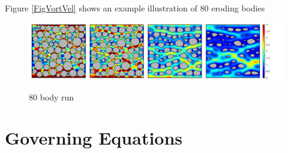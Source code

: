 \documentclass[3p]{elsarticle}
\newcommand{\vsp}[1]{\vspace{#1 pc} \noindent}
\begin{document}
\vsp{5}


Figure \ref{FigVortVel} shows an example illustration of 80 eroding bodies


\begin{figure}%
\centering \label{fig1}
\includegraphics[width = 0.99 \textwidth]{./figs/Velocity-80-4.pdf}
\caption{80 body run}
\end{figure}

\section{Governing Equations}
\label{sec:formulation}
\end{document}
